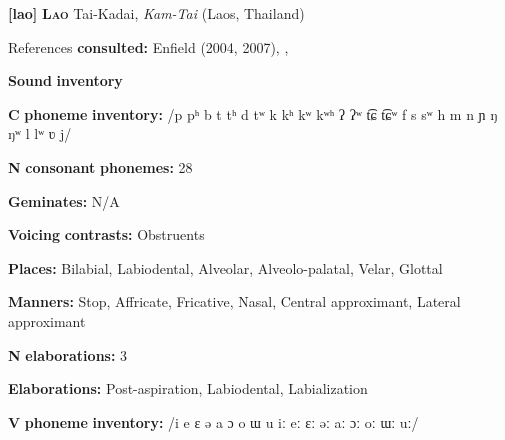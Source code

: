 \begin{styleBody}
\textbf{[lao]}   \textbf{\textsc{Lao}}  Tai-Kadai, \textit{Kam-Tai} (Laos, Thailand)
\end{styleBody}

\begin{styleBody}
References \textbf{consulted:} Enfield (2004, 2007), \citet{Erickson2001}, \citet{MorevEtAl1979}
\end{styleBody}

\begin{styleBody}
\textbf{Sound} \textbf{inventory}
\end{styleBody}

\begin{styleBody}
\textbf{C} \textbf{phoneme} \textbf{inventory:} /p pʰ b t tʰ d tʷ k kʰ kʷ kʷʰ ʔ ʔʷ t͡ɕ t͡ɕʷ f s sʷ h m n ɲ ŋ ŋʷ l lʷ ʋ j/
\end{styleBody}

\begin{styleBody}
\textbf{N} \textbf{consonant} \textbf{phonemes:} 28
\end{styleBody}

\begin{styleBody}
\textbf{Geminates:} N/A
\end{styleBody}

\begin{styleBody}
\textbf{Voicing} \textbf{contrasts:} Obstruents
\end{styleBody}

\begin{styleBody}
\textbf{Places:} Bilabial, Labiodental, Alveolar, Alveolo-palatal, Velar, Glottal
\end{styleBody}

\begin{styleBody}
\textbf{Manners:} Stop, Affricate, Fricative, Nasal, Central approximant, Lateral approximant
\end{styleBody}

\begin{styleBody}
\textbf{N} \textbf{elaborations:} 3
\end{styleBody}

\begin{styleBody}
\textbf{Elaborations:} Post-aspiration, Labiodental, Labialization
\end{styleBody}

\begin{styleBody}
\textbf{V} \textbf{phoneme} \textbf{inventory:} /i e ɛ ə a ɔ o ɯ u iː eː ɛː əː aː ɔː oː ɯː uː/
\end{styleBody}

